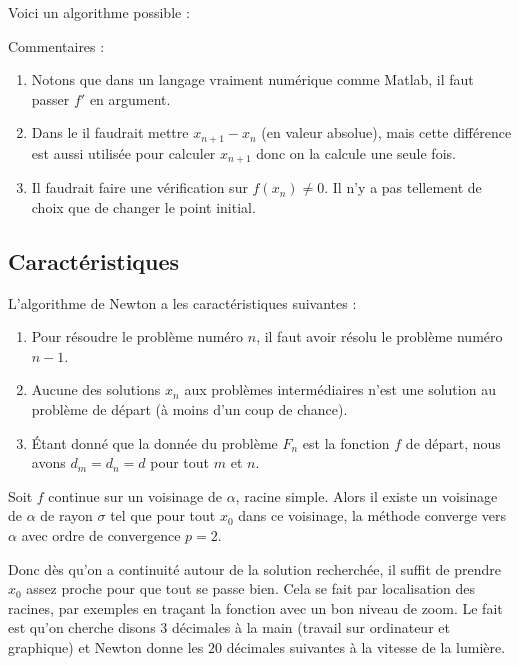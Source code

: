 Voici un algorithme possible :



Commentaires :
\begin{enumerate}
	\item
	      Notons que dans un langage vraiment numérique comme Matlab, il faut passer \( f'\) en argument.
	\item
	      Dans le  il faudrait mettre \( x_{n+1}-x_n\) (en valeur absolue), mais cette différence est aussi utilisée pour calculer \( x_{n+1}\) donc on la calcule une seule fois.
	\item
	      Il faudrait faire une vérification sur \( f(x_n)\neq 0\). Il n'y a pas tellement de choix que de changer le point initial.
\end{enumerate}

\subsection{Caractéristiques}

L'algorithme de Newton a les caractéristiques suivantes :
\begin{enumerate}

	\item
	      Pour résoudre le problème numéro \( n\), il faut avoir résolu le problème numéro \( n-1\).
	\item
	      Aucune des solutions \( x_n\) aux problèmes intermédiaires n'est une solution au problème de départ (à moins d'un coup de chance).
	\item
	      Étant donné que la donnée du problème \( F_n\) est la fonction \( f\) de départ, nous avons \( d_m=d_n=d\) pour tout \( m\) et \( n\).
\end{enumerate}

\begin{theorem}     \label{THOooMACHooLofCVu}
	Soit \( f\) continue sur un voisinage de \( \alpha\), racine simple. Alors il existe un voisinage de \( \alpha\) de rayon \( \sigma\) tel que pour tout \( x_0\) dans ce voisinage, la méthode converge vers \( \alpha\) avec ordre de convergence \( p=2\).
\end{theorem}

Donc dès qu'on a continuité autour de la solution recherchée, il suffit de prendre \( x_0\) assez proche pour que tout se passe bien. Cela se fait par localisation des racines, par exemples en traçant la fonction avec un bon niveau de zoom. Le fait est qu'on cherche disons \( 3\) décimales à la main (travail sur ordinateur et graphique) et Newton donne les \( 20\) décimales suivantes à la vitesse de la lumière.


